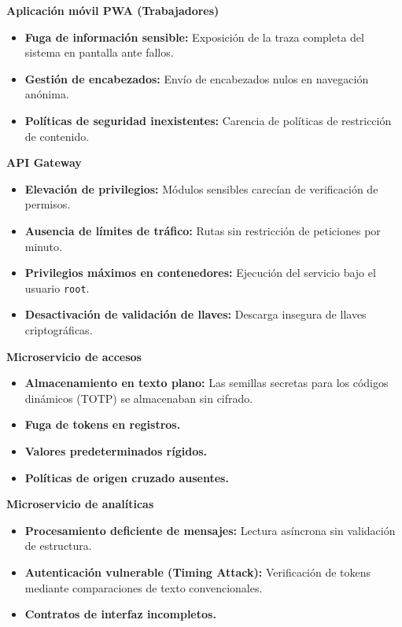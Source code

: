 \documentclass[conference, a4paper]{IEEEtran}
\begin{document}
\noindent \textbf{Aplicaci\'on m\'ovil PWA (Trabajadores)}
\begin{itemize}
    \item \textbf{Fuga de informaci\'on sensible:} Exposici\'on de la traza completa del sistema en pantalla ante fallos.
    \item \textbf{Gesti\'on de encabezados:} Env\'io de encabezados nulos en navegaci\'on an\'onima.
    \item \textbf{Pol\'iticas de seguridad inexistentes:} Carencia de pol\'iticas de restricci\'on de contenido.
\end{itemize}

\noindent \textbf{API Gateway}
\begin{itemize}
    \item \textbf{Elevaci\'on de privilegios:} M\'odulos sensibles carec\'ian de verificaci\'on de permisos.
    \item \textbf{Ausencia de l\'imites de tr\'afico:} Rutas sin restricci\'on de peticiones por minuto.
    \item \textbf{Privilegios m\'aximos en contenedores:} Ejecuci\'on del servicio bajo el usuario \texttt{root}.
    \item \textbf{Desactivaci\'on de validaci\'on de llaves:} Descarga insegura de llaves criptogr\'aficas.
\end{itemize}

\noindent \textbf{Microservicio de accesos}
\begin{itemize}
    \item \textbf{Almacenamiento en texto plano:} Las semillas secretas para los c\'odigos din\'amicos (TOTP) se almacenaban sin cifrado.
    \item \textbf{Fuga de tokens en registros.}
    \item \textbf{Valores predeterminados r\'igidos.}
    \item \textbf{Pol\'iticas de origen cruzado ausentes.}
\end{itemize}

\noindent \textbf{Microservicio de anal\'iticas}
\begin{itemize}
    \item \textbf{Procesamiento deficiente de mensajes:} Lectura as\'incrona sin validaci\'on de estructura.
    \item \textbf{Autenticaci\'on vulnerable (Timing Attack):} Verificaci\'on de tokens mediante comparaciones de texto convencionales.
    \item \textbf{Contratos de interfaz incompletos.}
\end{itemize}
\end{document}
